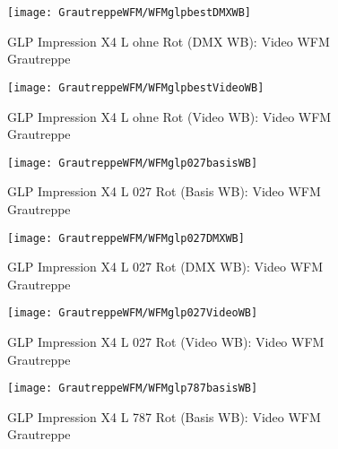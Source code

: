 \documentclass[pagesize,paper=A4,fontsize=12pt,utf8,numbers=noenddot,bibliography=totoc,listof=totoc,DIV=11,BCOR=1mm]{scrreprt}
\begin{document}
\begin{figure}[htp]     %
\centering
\texttt{[image: GrautreppeWFM/WFMglpbestDMXWB]} 
\caption {GLP Impression X4 L ohne Rot (DMX WB): Video WFM Grautreppe} 
\end{figure}

\begin{figure}[htp]     %
\centering
\texttt{[image: GrautreppeWFM/WFMglpbestVideoWB]} 
\caption {GLP Impression X4 L ohne Rot (Video WB): Video WFM Grautreppe} 
\end{figure}



\begin{figure}[htp]     %
\centering
\texttt{[image: GrautreppeWFM/WFMglp027basisWB]} 
\caption {GLP Impression X4 L 027 Rot (Basis WB): Video WFM Grautreppe} 
\end{figure}

\begin{figure}[htp]     %
\centering
\texttt{[image: GrautreppeWFM/WFMglp027DMXWB]} 
\caption {GLP Impression X4 L 027 Rot (DMX WB): Video WFM Grautreppe} 
\end{figure}

\begin{figure}[htp]     %
\centering
\texttt{[image: GrautreppeWFM/WFMglp027VideoWB]} 
\caption {GLP Impression X4 L 027 Rot (Video WB): Video WFM Grautreppe} 
\end{figure}



\begin{figure}[htp]     %
\centering
\texttt{[image: GrautreppeWFM/WFMglp787basisWB]} 
\caption {GLP Impression X4 L 787 Rot (Basis WB): Video WFM Grautreppe} 
\end{figure}
\end{document}
